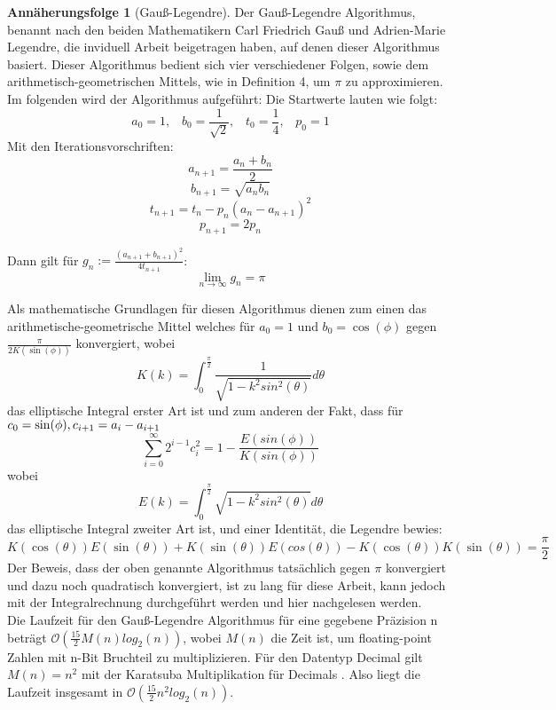 \documentclass{scrartcl}
\theoremstyle{definition}
\newtheorem{approximation sequence}{Annäherungsfolge}
\begin{document}
\begin{approximation sequence}[Gauß-Legendre]
Der Gauß-Legendre Algorithmus, benannt nach den beiden Mathematikern Carl Friedrich Gauß 
und Adrien-Marie Legendre, die inviduell Arbeit beigetragen haben, auf denen dieser Algorithmus basiert.
Dieser Algorithmus bedient sich vier verschiedener Folgen, sowie dem arithmetisch-geometrischen Mittels, 
wie in Definition 4, um \(\pi\) zu approximieren.
Im folgenden wird der Algorithmus aufgeführt: \cite{AGM-Gauß-Legendre}
Die Startwerte lauten wie folgt:
\[a_0 = 1, \;\;\; b_0 = \frac{1}{\sqrt{2}}, \;\;\; t_0 = \frac{1}{4}, \;\;\; p_0 = 1 \]
Mit den Iterationsvorschriften:
\[a_{n+1} = \frac{a_n + b_n}{2} \] 
\[b_{n+1} = \sqrt{a_nb_n} \]
\[t_{n+1} = t_n - p_n(a_n - a_{n+1})^2 \]
\[p_{n+1} = 2p_n \] 

Dann gilt für \(g_n := \frac{(a_{n+1} + b_{n+1})^2}{4t_{n+1}}\):
\[\lim_{n \to \infty}g_n = \pi \] 

Als mathematische Grundlagen \cite{Eugene-Salamin} für diesen Algorithmus dienen zum einen das arithmetische-geometrische Mittel welches 
für \(a_0 = 1 \text{ und } b_0 = \cos(\phi)\) gegen \(\frac{\pi}{2K(\sin(\phi))}\) konvergiert, wobei
\[K(k) = \int_{0}^{\frac{\pi}{2}} \frac{1}{\sqrt{1-k^2sin^2(\theta)}}d\theta \] das elliptische Integral erster Art ist und zum anderen
der Fakt, dass für \(c_0 = \sin(\phi), \\ c_{i+1} = a_i - a_{i+1}\)
\[ \sum_{i= 0}^{\infty} 2^{i-1} c_{i}^{2} = 1 - \frac{E(sin(\phi))}{K(sin(\phi))} \]
wobei \[E(k) = \int_{0}^{\frac{\pi}{2}}\sqrt{1-k^2sin^2(\theta)}d\theta\] das elliptische Integral zweiter Art ist,
und einer Identität, die Legendre bewies:
\[K(\cos(\theta))E(\sin(\theta)) + K(\sin(\theta))E(cos(\theta)) - K(\cos(\theta))K(\sin(\theta)) = \frac{\pi}{2} \] 
Der Beweis, dass der oben genannte Algorithmus tatsächlich gegen \(\pi\) konvergiert und dazu noch quadratisch konvergiert, ist zu lang 
für diese Arbeit, kann jedoch mit der Integralrechnung durchgeführt werden und hier \cite{Gauß-Legendre} nachgelesen werden. \\
Die Laufzeit für den Gauß-Legendre Algorithmus für eine gegebene Präzision n beträgt \(\mathcal{O}(\frac{15}{2}M(n)log_2(n))\),
wobei \(M(n)\) die Zeit ist, um floating-point Zahlen mit n-Bit Bruchteil zu multiplizieren. \cite{AGM-Gauß-Legendre}
Für den Datentyp Decimal gilt \(M(n) = n^2\) mit der Karatsuba Multiplikation für Decimals \cite{Decimal-Multiplication}.
Also liegt die Laufzeit insgesamt in \(\mathcal{O}(\frac{15}{2}n^2log_2(n))\).
\end{approximation sequence}
\end{document}
